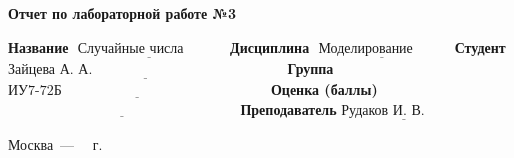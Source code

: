 \begin{titlepage}
	
	\begin{center}
		\Large\textbf{Отчет по лабораторной работе №3}\newline
	\end{center}
	
	\noindent\textbf{Название} $\underline{\text{~Случайные числа~~~~~~~~~}}$\newline\newline\newline
	\noindent\textbf{Дисциплина} $\underline{\text{~Моделирование~~~~~~~~}}$\newline\newline
	\noindent\textbf{Студент} $\underline{\text{Зайцева А. А.~~~~~~~~~~~~~~~~~~~~~~~~~~~~~~~~~~~~~~~~~}}$\newline\newline
	\noindent\textbf{Группа} $\underline{\text{ИУ7-72Б~~~~~~~~~~~~~~~~~~~~~~~~~~~~~~~~~~~~~~~~~~~~}}$\newline\newline
	\noindent\textbf{Оценка (баллы)} $\underline{\text{~~~~~~~~~~~~~~~~~~~~~~~~~~~~~~~~~~~~~~~~~~~~~~~~~}}$\newline\newline
	\noindent\textbf{Преподаватель}$\underline{\text{~Рудаков И. В.~~~~~~~~~~}}$\newline
	
	\begin{center}
		\vfill
		Москва~---~\the\year
		~г.
	\end{center}
 \restoregeometry
\end{titlepage}
